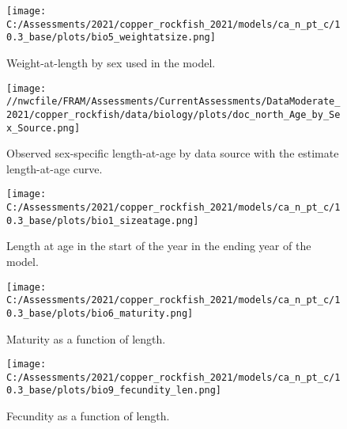 \documentclass[11pt,
  english,
  a4paper,
]{article}
\begin{document}
\begin{figure}
\centering
\texttt{[image: C:/Assessments/2021/copper\_rockfish\_2021/models/ca\_n\_pt\_c/10.3\_base/plots/bio5\_weightatsize.png]}
\caption{Weight-at-length by sex used in the model.\label{fig:len-weight}}
\end{figure}

\tagmcend\tagstructend


\begin{figure}
\centering
\texttt{[image: //nwcfile/FRAM/Assessments/CurrentAssessments/DataModerate\_2021/copper\_rockfish/data/biology/plots/doc\_north\_Age\_by\_Sex\_Source.png]}
\caption{Observed sex-specific length-at-age by data source with the estimate length-at-age curve.\label{fig:len-age-data}}
\end{figure}

\tagmcend\tagstructend


\begin{figure}
\centering
\texttt{[image: C:/Assessments/2021/copper\_rockfish\_2021/models/ca\_n\_pt\_c/10.3\_base/plots/bio1\_sizeatage.png]}
\caption{Length at age in the start of the year in the ending year of the model.\label{fig:len-age-ss}}
\end{figure}

\tagmcend\tagstructend

\clearpage


\begin{figure}
\centering
\texttt{[image: C:/Assessments/2021/copper\_rockfish\_2021/models/ca\_n\_pt\_c/10.3\_base/plots/bio6\_maturity.png]}
\caption{Maturity as a function of length.\label{fig:maturity}}
\end{figure}

\tagmcend\tagstructend

\clearpage


\begin{figure}
\centering
\texttt{[image: C:/Assessments/2021/copper\_rockfish\_2021/models/ca\_n\_pt\_c/10.3\_base/plots/bio9\_fecundity\_len.png]}
\caption{Fecundity as a function of length.\label{fig:fecundity}}
\end{figure}
\end{document}
